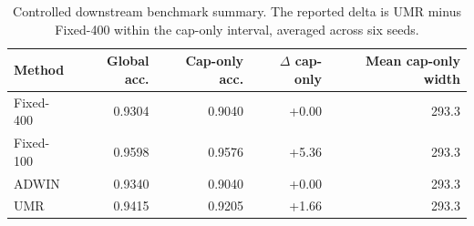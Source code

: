 \begin{table}[!htbp]
\centering
\caption{Controlled downstream benchmark summary. The reported delta is UMR minus Fixed-400 within the cap-only interval, averaged across six seeds.}
\label{tab:temporal_invalidity}
\begin{tabular}{lrrrr}
\toprule
Method & Global acc. & Cap-only acc. & $\Delta$ cap-only & Mean cap-only width \\
\midrule
Fixed-400 & 0.9304 & 0.9040 & +0.00 & 293.3 \\
Fixed-100 & 0.9598 & 0.9576 & +5.36 & 293.3 \\
ADWIN & 0.9340 & 0.9040 & +0.00 & 293.3 \\
UMR & 0.9415 & 0.9205 & +1.66 & 293.3 \\
\bottomrule
\end{tabular}
\end{table}
